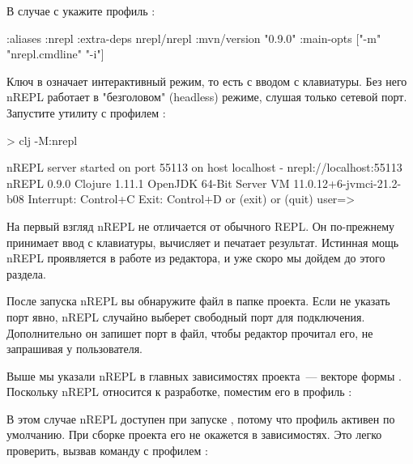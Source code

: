 В случае с  укажите профиль :

\begin{english}
  \begin{clojure}
{:aliases
 {:nrepl
  {:extra-deps
   {nrepl/nrepl {:mvn/version "0.9.0"}}
   :main-opts ["-m" "nrepl.cmdline" "-i"]}}}
  \end{clojure}
\end{english}

Ключ  в  означает интерактивный режим, то есть с вводом с клавиатуры. Без него nREPL работает в "безголовом" (headless) режиме, слушая только сетевой порт. Запустите утилиту  с профилем :

\begin{english}
  \begin{text}
> clj -M:nrepl

nREPL server started on port 55113 on host localhost - nrepl://localhost:55113
nREPL 0.9.0
Clojure 1.11.1
OpenJDK 64-Bit Server VM 11.0.12+6-jvmci-21.2-b08
Interrupt: Control+C
Exit:      Control+D or (exit) or (quit)
user=>
  \end{text}
\end{english}

На первый взгляд nREPL не отличается от обычного REPL. Он по-прежнему принимает ввод с клавиатуры, вычисляет и печатает результат. Истинная мощь nREPL проявляется в работе из редактора, и уже скоро мы дойдем до этого раздела.

После запуска nREPL вы обнаружите файл  в папке проекта. Если не указать порт явно, nREPL случайно выберет свободный порт для подключения. Дополнительно он запишет порт в файл, чтобы редактор прочитал его, не запрашивая у пользователя.

Выше мы указали nREPL в главных зависимостях проекта~--- векторе  формы . Поскольку nREPL относится к разработке, поместим его в профиль :

\begin{english}
  \begin{clojure}
:profiles
{:dev {:dependencies [[nrepl/nrepl "0.9.0"]]}
  \end{clojure}
\end{english}

В этом случае nREPL доступен при запуске , потому что профиль  активен по умолчанию. При сборке проекта его не окажется в зависимостях. Это легко проверить, вызвав команду  с профилем :

